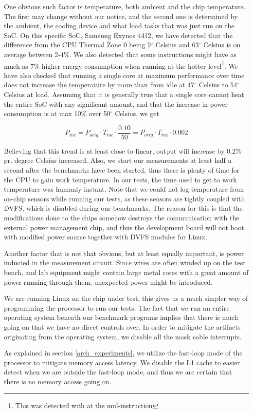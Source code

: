 \label{sec:temperature}
One obvious such factor is temperature, both ambient and the chip temperature.
The first may change without our notice, and the second one is determined by the
ambient, the cooling device and what load tasks that was just run on the SoC. On
this specific SoC, Samsung Exynos 4412, we have detected that the difference
from the CPU Thermal Zone 0 being 9$^\circ$ Celsius and 63$^\circ$ Celsius is on
average between 2-4\%. We also detected that some instructions might have as
much as 7\% higher energy consumption when running at the hotter
level\footnote{This was detected with at the {\ttfamily mul}-instruction}. We
have also checked that running a single core at maximum performance over time
does not increase the temperature by more than from idle at 47$^\circ$ Celsius
to 54$^\circ$ Celsius at load. Assuming that it is generally true that a single
core cannot heat the entire SoC with any significant amount, and that the
increase in power consumption is at max 10\% over 50$^\circ$ Celsius, we get

\begin{equation}
    P_{inc} = P_{orig} \cdot T_{inc} \cdot \frac{0.10}{50} = P_{orig} \cdot T_{inc} \cdot 0.002
\end{equation}

Believing that this trend is at least close to linear, output will increase by
0.2\% pr. degree Celsius increased. Also, we start our measurements at least
half a second after the benchmarks have been started, thus there is plenty of
time for the CPU to gain work temperature. In our tests, the time used to get to
work temperature was humanly instant. Note that we could not log temperature
from on-chip sensors while running our tests, as these sensors are tightly coupled
with DVFS, which is disabled during our benchmarks. The reason for this is that
the modifications done to the chips somehow destroys the communication with the external
power management chip, and thus the development board will not boot with modified
power source together with DVFS modules for Linux.

Another factor that is not that obvious, but at least equally important, is
power inducted in the measurement circuit. Since wires are often winded up on
the test bench, and lab equipment might contain large metal cores with a great
amount of power running through them, unexpected power might be introduced.

We are running Linux on the chip under test, this gives us a much simpler way of
programming the processor to run our tests. The fact that we run an entire
operating system beneath our benchmark programs implies that there is much going
on that we have no direct controls over. In order to mitigate the artifacts
originating from the operating system, we disable all the mask cable interrupts.

As explained in section \ref{arch_experiments}, we utilize the fast-loop mode of
the processor to mitigate memory access latency. We disable the L1 cache to
easier detect when we are outside the fast-loop mode, and thus we are certain
that there is no memory access going on.
